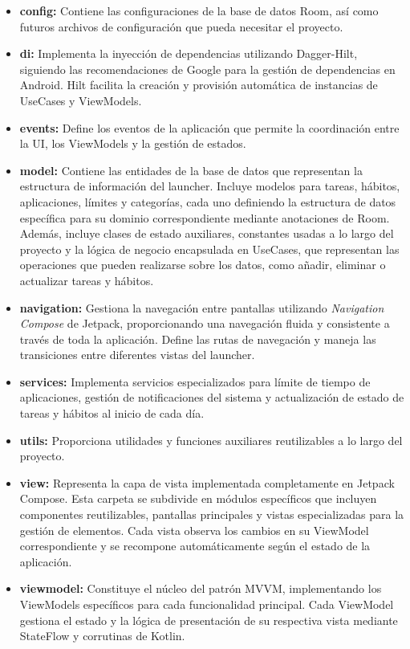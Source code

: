 \begin{itemize}
    \item \textbf{config:} Contiene las configuraciones de la base de datos Room, así como futuros archivos de configuración que pueda necesitar el proyecto.
    
    \item \textbf{di:} Implementa la inyección de dependencias utilizando Dagger-Hilt, siguiendo las recomendaciones de Google para la gestión de dependencias en Android. Hilt facilita la creación y provisión automática de instancias de UseCases y ViewModels.
    
    \item \textbf{events:} Define los eventos de la aplicación que permite la coordinación entre la UI, los ViewModels y la gestión de estados.
    
    \item \textbf{model:} Contiene las entidades de la base de datos que representan la estructura de información del launcher. Incluye modelos para tareas, hábitos, aplicaciones, límites y categorías, cada uno definiendo la estructura de datos específica para su dominio correspondiente mediante anotaciones de Room. Además, incluye clases de estado auxiliares, constantes usadas a lo largo del proyecto y la lógica de negocio encapsulada en UseCases, que representan las operaciones que pueden realizarse sobre los datos, como añadir, eliminar o actualizar tareas y hábitos.
    
    \item \textbf{navigation:} Gestiona la navegación entre pantallas utilizando \textit{Navigation Compose} de Jetpack, proporcionando una navegación fluida y consistente a través de toda la aplicación. Define las rutas de navegación y maneja las transiciones entre diferentes vistas del launcher.
    
    \item \textbf{services:} Implementa servicios especializados para límite de tiempo de aplicaciones, gestión de notificaciones del sistema y actualización de estado de tareas y hábitos al inicio de cada día.
    
    \item \textbf{utils:} Proporciona utilidades y funciones auxiliares reutilizables a lo largo del proyecto.
    
    \item \textbf{view:} Representa la capa de vista implementada completamente en Jetpack Compose. Esta carpeta se subdivide en módulos específicos que incluyen componentes reutilizables, pantallas principales y vistas especializadas para la gestión de elementos. Cada vista observa los cambios en su ViewModel correspondiente y se recompone automáticamente según el estado de la aplicación.
    
    \item \textbf{viewmodel:} Constituye el núcleo del patrón MVVM, implementando los ViewModels específicos para cada funcionalidad principal. Cada ViewModel gestiona el estado y la lógica de presentación de su respectiva vista mediante StateFlow y corrutinas de Kotlin.
\end{itemize}